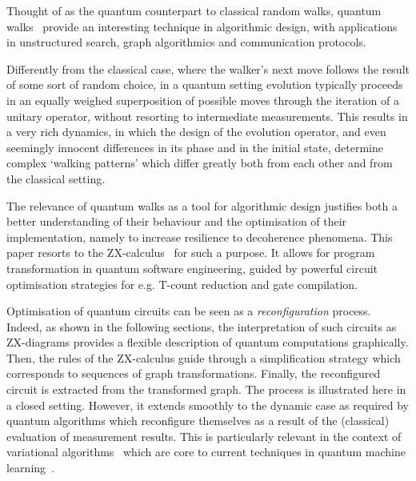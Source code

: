 Thought of as the quantum counterpart to classical random walks, quantum walks~\cite{QW-overview} provide an interesting technique in algorithmic design, 
with  applications in unstructured search, graph algorithmics and communication protocols.

Differently from the classical case, where the  walker's next move follows the result of some sort of random choice, in a quantum setting evolution typically 
proceeds in an equally weighed superposition of possible moves through the iteration of a unitary operator, without resorting to intermediate measurements. 
This results in a very rich dynamics, in which the design of the evolution operator, and even seemingly
innocent differences  in its phase  and in the initial state, determine complex `walking patterns'  
which differ greatly both from each other and from the classical setting.

The relevance of quantum walks as a tool for algorithmic design justifies both a better understanding of their behaviour and the optimisation of their implementation, namely to increase resilience to decoherence phenomena. This  paper resorts to the ZX-calculus~\cite{CoeckeD08,ZX-overview,CoeckeHKW22} for such a purpose. 
It allows for program transformation in quantum software engineering, guided by powerful  circuit optimisation strategies for e.g. T-count reduction and gate compilation.

Optimisation of quantum circuits can be seen as a \emph{reconfiguration} process. Indeed, as shown in the following sections, the interpretation of such circuits as ZX-diagrams provides a flexible description of quantum computations graphically. Then, the rules of the ZX-calculus guide through a simplification strategy which corresponds to sequences of graph transformations. Finally, the reconfigured  circuit is extracted from the transformed graph. The process is illustrated here in a closed setting. However, it extends smoothly to the dynamic case as required by quantum algorithms which reconfigure themselves as a result of the (classical) evaluation of measurement results.  This is particularly relevant in the context of variational algorithms~\cite{Cer21} which are core to current techniques in quantum machine learning~\cite{Dun16}.



